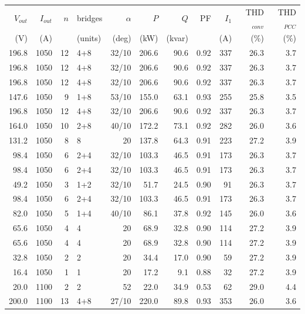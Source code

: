\begin{tabular}{rrrlrrrrrrr}
\toprule
$V_{out}$ & $I_{out}$ & $n$ & bridges & $\alpha$ & $P$ & $Q$ & PF & $I_1$ & THD$_{conv}$ & THD$_{PCC}$\\
(V) & (A) & & (units) & (deg) & (kW) & (kvar) & & (A) & (\%) & (\%)\\
\midrule
196.8 & 1050 & 12 & 4+8 & 32/10 & 206.6 & 90.6 & 0.92 & 337 & 26.3 & 3.7\\
196.8 & 1050 & 12 & 4+8 & 32/10 & 206.6 & 90.6 & 0.92 & 337 & 26.3 & 3.7\\
196.8 & 1050 & 12 & 4+8 & 32/10 & 206.6 & 90.6 & 0.92 & 337 & 26.3 & 3.7\\
147.6 & 1050 & 9 & 1+8 & 53/10 & 155.0 & 63.1 & 0.93 & 255 & 25.8 & 3.5\\
196.8 & 1050 & 12 & 4+8 & 32/10 & 206.6 & 90.6 & 0.92 & 337 & 26.3 & 3.7\\
164.0 & 1050 & 10 & 2+8 & 40/10 & 172.2 & 73.1 & 0.92 & 282 & 26.0 & 3.6\\
131.2 & 1050 & 8 & 8 & 20 & 137.8 & 64.3 & 0.91 & 223 & 27.2 & 3.9\\
98.4 & 1050 & 6 & 2+4 & 32/10 & 103.3 & 46.5 & 0.91 & 173 & 26.3 & 3.7\\
98.4 & 1050 & 6 & 2+4 & 32/10 & 103.3 & 46.5 & 0.91 & 173 & 26.3 & 3.7\\
49.2 & 1050 & 3 & 1+2 & 32/10 & 51.7 & 24.5 & 0.90 & 91 & 26.3 & 3.7\\
98.4 & 1050 & 6 & 2+4 & 32/10 & 103.3 & 46.5 & 0.91 & 173 & 26.3 & 3.7\\
82.0 & 1050 & 5 & 1+4 & 40/10 & 86.1 & 37.8 & 0.92 & 145 & 26.0 & 3.6\\
65.6 & 1050 & 4 & 4 & 20 & 68.9 & 32.8 & 0.90 & 114 & 27.2 & 3.9\\
65.6 & 1050 & 4 & 4 & 20 & 68.9 & 32.8 & 0.90 & 114 & 27.2 & 3.9\\
32.8 & 1050 & 2 & 2 & 20 & 34.4 & 17.0 & 0.90 & 59 & 27.2 & 3.9\\
16.4 & 1050 & 1 & 1 & 20 & 17.2 & 9.1 & 0.88 & 32 & 27.2 & 3.9\\
20.0 & 1100 & 2 & 2 & 52 & 22.0 & 34.9 & 0.53 & 62 & 29.0 & 4.4\\
200.0 & 1100 & 13 & 4+8 & 27/10 & 220.0 & 89.8 & 0.93 & 353 & 26.0 & 3.6\\
\bottomrule
\end{tabular}
